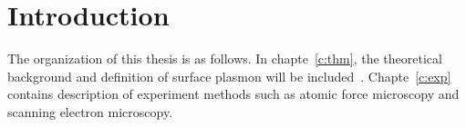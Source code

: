 \chapter{Introduction}
\label{c:intro}

The organization of this thesis is as follows. In chapte~\ref{c:thm}, the theoretical background and definition of surface plasmon will be included~\cite{maier2007plasmonics}. Chapte~\ref{c:exp} contains description of experiment methods such as atomic force microscopy and scanning electron microscopy. 

%
%